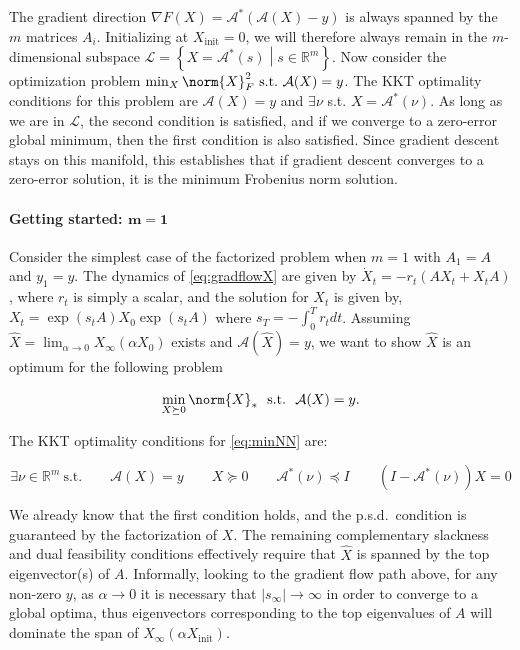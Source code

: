 The gradient direction $\nabla
F(X) = \mathcal{A}^*(\mathcal{A}(X)-y)$ is always spanned by the $m$ matrices $A_i$.  Initializing at $X_{\textrm{init}}=0$, we will therefore always remain in the $m$-dimensional subspace $\mathcal{L} = \left\{ X=\mathcal{A}^*(s)
  \middle| s\in\mathbb{R}^m \right\}$.  Now consider the optimization problem
$\min_X \norm{X}^2_F\ \text{s.t.}\ \mathcal{A}(X)=y$.  The KKT optimality conditions for this problem are $\mathcal{A}(X)=y$  and $\exists \nu$ s.t. 
$X=\mathcal{A}^*(\nu)$.  As long as we are in $\mathcal{L}$, the second condition is satisfied, and if we converge to a zero-error global minimum, then the first condition is also satisfied.  Since gradient descent stays on this manifold, this establishes that if gradient descent converges to a zero-error solution, it is the minimum Frobenius norm solution.

\paragraph{Getting started: $\mathbf{m=1}$} Consider the simplest case of the factorized problem when $m=1$ with $A_1=A$ and $y_1=y$. The dynamics of \eqref{eq:gradflowX} are given by $\dot{X}_t =- r_t (A X_t + X_tA)$, where $r_t$ is simply a scalar, and the solution for $X_t$ is given by, $X_t  = \exp\left( s_t A \right)X_0\exp\left( s_t A \right)$
where $s_T = -\int_0^T r_tdt$. Assuming  $\widehat{X} =
\lim_{\alpha\to0}X_\infty (\alpha X_0)$ exists and $\mathcal{A}(\widehat{X}) = y$, we want to show $\widehat{X}$ is an optimum for the following problem

\begin{equation}\label{eq:minNN}
\min_{X\succeq 0} \norm{X}_*\ \ \textrm{s.t.}\ \ \mathcal{A}(X) = y.
\end{equation}

The KKT optimality conditions for \eqref{eq:minNN} are:

\begin{equation} \label{eq:KKT} 
\exists \nu \in \mathbb{R}^m\ \textrm{s.t.}
\qquad \mathcal{A}(X) = y 
\qquad X \succeq 0
\qquad \mathcal{A}^*(\nu) \preceq I
\qquad (I - \mathcal{A}^*(\nu))X = 0
\end{equation}

We already know that the first condition holds, and the p.s.d.~condition is guaranteed by the factorization of $X$. The remaining complementary slackness and dual feasibility conditions effectively require that $\widehat{X}$ is spanned by the top eigenvector(s) of $A$. Informally, looking to the gradient flow path above, for any non-zero $y$, as $\alpha\to 0$ it is necessary that
$|s_\infty|\to \infty$ in order to converge to a global optima, thus eigenvectors corresponding to the top eigenvalues of $A$ will dominate the span of $X_\infty(\alpha X_{\textrm{init}})$.

